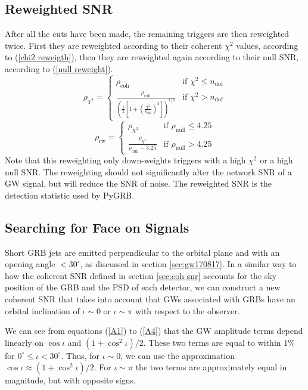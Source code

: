 \documentclass[11pt]{cuthesis}
\begin{document}
\subsection{Reweighted SNR} \label{sec:reweighted snr}
After all the cuts have been made, the remaining triggers are then reweighted twice. First they are reweighted according to their coherent $\chi^2$ values, according to (\ref{chi2 reweigth}), then they are reweighted again according to their null SNR, according to (\ref{null reweight}).
\begin{equation}  \label{chi2 reweigth}
\rho_{\chi^2} = \begin{cases} \rho_\text{coh} & \mbox{if } \chi^2 \leq n_\text{dof} \\ \frac{\rho_\text{coh}}{\left( \frac{1}{2} \left[ 1 + \left( \frac{\chi^2}{n_\text{dof}} \right)^3 \right] \right)^{1/6} } & \mbox{if } \chi^2 > n_\text{dof}\end{cases}
\end{equation}  
\begin{equation} \label{null reweight}
\rho_\text{rw} = \begin{cases} \rho_{\chi^2} & \mbox{if } \rho_\text{null} \leq 4.25 \\ \frac{\rho_{\chi^2}}{ \rho_\text{null} -3.25} & \mbox{if } \rho_\text{null} > 4.25\end{cases}
\end{equation}
Note that this reweighting only down-weights triggers with a high $\chi^2$ or a high null SNR. The reweighting should not significantly alter the network SNR of a GW signal, but will reduce the SNR of noise. The reweighted SNR is the detection statistic used by PyGRB. 

\subsection{Searching for Face on Signals} \label{sec:circ pol}
Short GRB jets are emitted perpendicular to the orbital plane and with an opening angle $<30^\circ$, as discussed in section \ref{sec:gw170817}. In a similar way to how the coherent SNR defined in section \ref{sec:coh snr} accounts for the sky position of the GRB and the PSD of each detector, we can construct a new coherent SNR that takes into account that GWs associated with GRBs have an orbital inclination of $\iota \sim 0$ or $\iota \sim \pi$ with respect to the observer.

We can see from equations (\ref{A1}) to (\ref{A4}) that the GW amplitude terms depend linearly on $\cos\iota$ and $(1+\cos^2\iota)/2$. These two terms are equal to within $1\%$ for $0^\circ\leq\iota<30^\circ$. Thus, for $\iota \sim 0$, we can use the approximation $\cos\iota \approx (1+\cos^2\iota)/2$. For $\iota \sim \pi$ the two terms are approximately equal in magnitude, but with opposite signs. 
\end{document}
